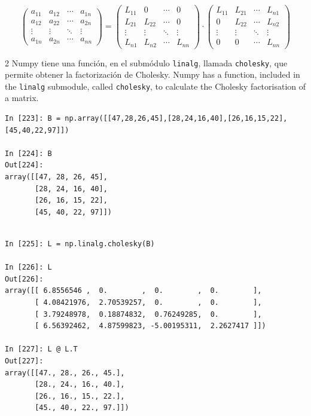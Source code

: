 \begin{equation*}
\begin{pmatrix}
a_{11}& a_{12}& \cdots & a_{1n}\\
a_{12}& a_{22}& \cdots & a_{2n}\\
\vdots & \vdots & \ddots & \vdots\\
a_{1n}& a_{2n}& \cdots & a_{nn}
\end{pmatrix}=\begin{pmatrix}
L_{11}& 0& \cdots & 0\\
L_{21}& L_{22}& \cdots & 0\\
\vdots & \vdots & \ddots & \vdots\\
L_{n1}& L_{n2}& \cdots & L_{nn}
\end{pmatrix} \cdot \begin{pmatrix}
L_{11}& L_{21}& \cdots & L_{n1}\\
0& L_{22}& \cdots & L_{n2}\\
\vdots & \vdots & \ddots & \vdots\\
0& 0& \cdots & L_{nn}
\end{pmatrix}
\end{equation*}
\begin{paracol}{2}
Numpy tiene una función, en el submódulo \texttt{linalg}, llamada \texttt{cholesky}, que permite obtener la factorización de Cholesky.
\switchcolumn
Numpy has a function, included in the \texttt{linalg} submodule, called \texttt{cholesky}, to calculate the Cholesky factorisation of a matrix.
\end{paracol}
\begin{center}
    \begin{minipage}{0.5\textwidth}
    \begin{verbatim}
In [223]: B = np.array([[47,28,26,45],[28,24,16,40],[26,16,15,22],[45,40,22,97]])

In [224]: B
Out[224]: 
array([[47, 28, 26, 45],
       [28, 24, 16, 40],
       [26, 16, 15, 22],
       [45, 40, 22, 97]])
          \end{verbatim}        
   \end{minipage}
\end{center}

\begin{center}
\begin{minipage}{0.5\textwidth}
\begin{verbatim}

In [225]: L = np.linalg.cholesky(B)

In [226]: L
Out[226]: 
array([[ 6.8556546 ,  0.        ,  0.        ,  0.        ],
       [ 4.08421976,  2.70539257,  0.        ,  0.        ],
       [ 3.79248978,  0.18874832,  0.76249285,  0.        ],
       [ 6.56392462,  4.87599823, -5.00195311,  2.2627417 ]])

In [227]: L @ L.T
Out[227]: 
array([[47., 28., 26., 45.],
       [28., 24., 16., 40.],
       [26., 16., 15., 22.],
       [45., 40., 22., 97.]])
    \end{verbatim}        
    \end{minipage}
\end{center}

